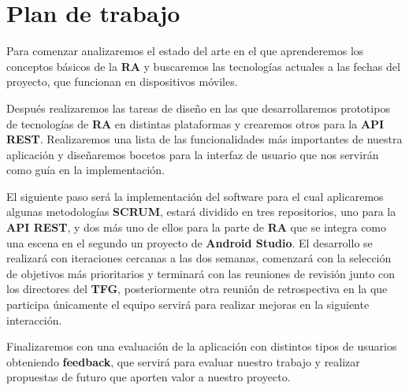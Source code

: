 \newpage
\section{Plan de trabajo}
\begin{flushleft}
    Para comenzar analizaremos el estado del arte en el que aprenderemos los conceptos
     básicos de la \textbf{RA} y buscaremos las tecnologías actuales a las fechas del proyecto,
     que funcionan en dispositivos móviles.
\end{flushleft}

\begin{flushleft}     
    Después realizaremos las tareas de diseño en las que desarrollaremos prototipos de
     tecnologías de \textbf{RA} en distintas plataformas y crearemos otros para la \textbf{API REST}.
     Realizaremos una lista de las funcionalidades más importantes de nuestra aplicación
     y diseñaremos bocetos para la interfaz de usuario que nos servirán como guía en
     la implementación.
\end{flushleft}

\begin{flushleft}    
    El siguiente paso será la implementación del software para el cual aplicaremos
     algunas metodologías \textbf{SCRUM}, estará dividido en tres repositorios, uno para la
     \textbf{API REST}, y dos más uno de ellos para la parte de \textbf{RA} que se integra como una
     escena en el segundo un proyecto de \textbf{Android Studio}. El desarrollo se realizará
     con iteraciones cercanas a las dos semanas, comenzará con la selección de
     objetivos más prioritarios y terminará con las reuniones de revisión junto
     con los directores del \textbf{TFG}, posteriormente otra reunión de retrospectiva en
     la que participa únicamente el equipo servirá para realizar mejoras en la
     siguiente interacción.
\end{flushleft}

\begin{flushleft}        
    Finalizaremos con una evaluación de la aplicación con distintos tipos de
     usuarios obteniendo \textbf{feedback}, que servirá para evaluar nuestro trabajo y
     realizar propuestas de futuro que aporten valor a nuestro proyecto.
\end{flushleft}
\label{makereference1.3}



